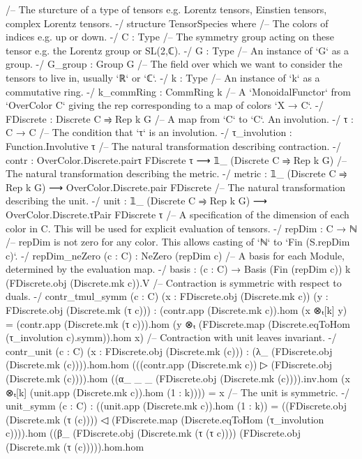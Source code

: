 \documentclass[a4paper, 11pt]{article}
\begin{document}
\begin{codeLong}
/-- The sturcture of a type of tensors e.g. Lorentz tensors, Einstien tensors,
  complex Lorentz tensors. -/
structure TensorSpecies where
  /-- The colors of indices e.g. up or down. -/
  C : Type
  /-- The symmetry group acting on these tensor e.g. the Lorentz group or SL(2,ℂ). -/
  G : Type
  /-- An instance of `G` as a group. -/
  G_group : Group G
  /-- The field over which we want to consider the tensors to live in, usually `ℝ` or `ℂ`. -/
  k : Type
  /-- An instance of `k` as a commutative ring. -/
  k_commRing : CommRing k
  /-- A `MonoidalFunctor` from `OverColor C` giving the rep corresponding to a map of colors
    `X → C`. -/
  FDiscrete : Discrete C ⥤ Rep k G
  /-- A map from `C` to `C`. An involution. -/
  τ : C → C
  /-- The condition that `τ` is an involution. -/
  τ_involution : Function.Involutive τ
  /-- The natural transformation describing contraction. -/
  contr : OverColor.Discrete.pairτ FDiscrete τ ⟶ 𝟙_ (Discrete C ⥤ Rep k G)
  /-- The natural transformation describing the metric. -/
  metric : 𝟙_ (Discrete C ⥤ Rep k G) ⟶ OverColor.Discrete.pair FDiscrete
  /-- The natural transformation describing the unit. -/
  unit : 𝟙_ (Discrete C ⥤ Rep k G) ⟶ OverColor.Discrete.τPair FDiscrete τ
  /-- A specification of the dimension of each color in C. This will be used for explicit
    evaluation of tensors. -/
  repDim : C → ℕ
  /-- repDim is not zero for any color. This allows casting of `ℕ` to `Fin (S.repDim c)`. -/
  repDim_neZero (c : C) : NeZero (repDim c)
  /-- A basis for each Module, determined by the evaluation map. -/
  basis : (c : C) → Basis (Fin (repDim c)) k (FDiscrete.obj (Discrete.mk c)).V
  /-- Contraction is symmetric with respect to duals. -/
  contr_tmul_symm (c : C) (x : FDiscrete.obj (Discrete.mk c))
      (y : FDiscrete.obj (Discrete.mk (τ c))) :
    (contr.app (Discrete.mk c)).hom (x ⊗ₜ[k] y) = (contr.app (Discrete.mk (τ c))).hom
      (y ⊗ₜ (FDiscrete.map (Discrete.eqToHom (τ_involution c).symm)).hom x)
  /-- Contraction with unit leaves invariant. -/
  contr_unit (c : C) (x : FDiscrete.obj (Discrete.mk (c))) :
    (λ_ (FDiscrete.obj (Discrete.mk (c)))).hom.hom
    (((contr.app (Discrete.mk c)) ▷ (FDiscrete.obj (Discrete.mk (c)))).hom
    ((α_ _ _ (FDiscrete.obj (Discrete.mk (c)))).inv.hom
    (x ⊗ₜ[k] (unit.app (Discrete.mk c)).hom (1 : k)))) = x
  /-- The unit is symmetric. -/
  unit_symm (c : C) :
    ((unit.app (Discrete.mk c)).hom (1 : k)) =
    ((FDiscrete.obj (Discrete.mk (τ (c)))) ◁
      (FDiscrete.map (Discrete.eqToHom (τ_involution c)))).hom
    ((β_ (FDiscrete.obj (Discrete.mk (τ (τ c)))) (FDiscrete.obj (Discrete.mk (τ (c))))).hom.hom

\end{codeLong}
\end{document}
